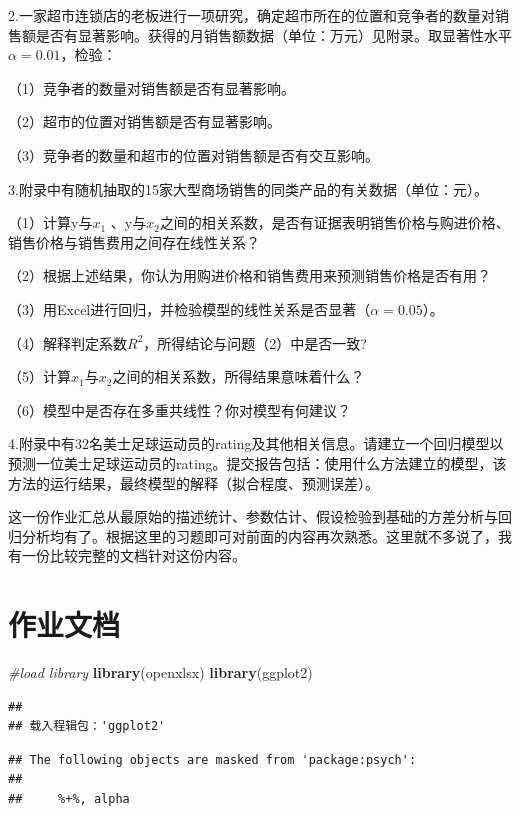 \documentclass[]{ctexbook}
\newenvironment{Shaded}{\begin{snugshade}}{\end{snugshade}}
\newcommand{\CommentTok}[1]{\textcolor[rgb]{0.56,0.35,0.01}{\textit{#1}}}
\newcommand{\KeywordTok}[1]{\textcolor[rgb]{0.13,0.29,0.53}{\textbf{#1}}}
\newcommand{\NormalTok}[1]{#1}
\begin{document}
2.一家超市连锁店的老板进行一项研究，确定超市所在的位置和竞争者的数量对销售额是否有显著影响。获得的月销售额数据（单位：万元）见附录。取显著性水平\(\alpha=0.01\)，检验：

（1）竞争者的数量对销售额是否有显著影响。

（2）超市的位置对销售额是否有显著影响。

（3）竞争者的数量和超市的位置对销售额是否有交互影响。

3.附录中有随机抽取的15家大型商场销售的同类产品的有关数据（单位：元）。

（1）计算y与\(x_1\) 、y与\(x_2\)之间的相关系数，是否有证据表明销售价格与购进价格、销售价格与销售费用之间存在线性关系？

（2）根据上述结果，你认为用购进价格和销售费用来预测销售价格是否有用？

（3）用Excel进行回归，并检验模型的线性关系是否显著（\(\alpha=0.05\)）。

（4）解释判定系数\(R^2\)，所得结论与问题（2）中是否一致?

（5）计算\(x_1\)与\(x_2\)之间的相关系数，所得结果意味着什么？

（6）模型中是否存在多重共线性？你对模型有何建议？

4.附录中有32名美士足球运动员的rating及其他相关信息。请建立一个回归模型以预测一位美士足球运动员的rating。提交报告包括：使用什么方法建立的模型，该方法的运行结果，最终模型的解释（拟合程度、预测误差）。

这一份作业汇总从最原始的描述统计、参数估计、假设检验到基础的方差分析与回归分析均有了。根据这里的习题即可对前面的内容再次熟悉。这里就不多说了，我有一份比较完整的文档针对这份内容。

\hypertarget{ux4f5cux4e1aux6587ux6863}{%
\section{作业文档}\label{ux4f5cux4e1aux6587ux6863}}

\begin{Shaded}
\begin{Highlighting}[]
\CommentTok{#load library}
\KeywordTok{library}\NormalTok{(openxlsx)}
\KeywordTok{library}\NormalTok{(ggplot2)}
\end{Highlighting}
\end{Shaded}

\begin{verbatim}
## 
## 载入程辑包：'ggplot2'
\end{verbatim}

\begin{verbatim}
## The following objects are masked from 'package:psych':
## 
##     %+%, alpha
\end{verbatim}
\end{document}
